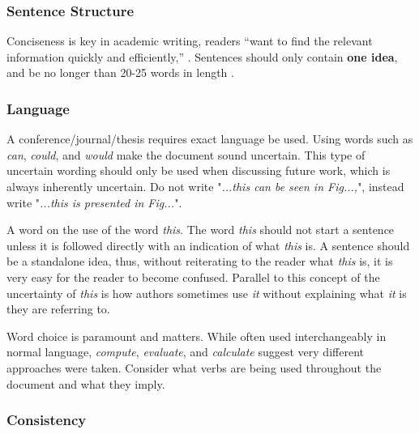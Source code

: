 \subsubsection{Sentence Structure}
Conciseness is key in academic writing, readers ``want to find the relevant information quickly and efficiently,'' \cite{writingSpringer}. 
Sentences should only contain \textbf{one idea}, and be no longer than 20-25 words in length \cite{writingSpringer}. 


\subsubsection{Language}

A conference/journal/thesis requires exact language be used. 
Using words such as \textit{can}, \textit{could}, and \textit{would} make the document sound uncertain. 
This type of uncertain wording should only be used when discussing future work, which is always inherently uncertain. 
Do not write "\textit{...this can be seen in Fig...,}", instead write "\textit{...this is presented in Fig...}".

A word on the use of the word \textit{this}. 
The word \textit{this} should not start a sentence unless it is followed directly with an indication of what \textit{this} is. 
A sentence should be a standalone idea, thus, without reiterating to the reader what \textit{this} is, it is very easy for the reader to become confused. 
Parallel to this concept of the uncertainty of \textit{this} is how authors sometimes use \textit{it} without explaining what \textit{it} is they are referring to. 

Word choice is paramount and matters. While often used interchangeably in normal language, \textit{compute}, \textit{evaluate}, and \textit{calculate} suggest very different approaches were taken. Consider what verbs are being used throughout the document and what they imply. 

\subsubsection{Consistency} \label{sec:consistencySubsection}

